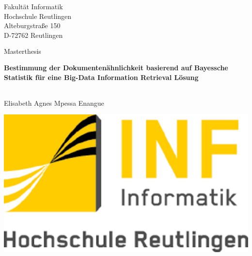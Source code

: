 \documentclass[paper=a4,       %
					 11pt,
					 BCOR0mm,  %
					 DIV10,    %
					 automark, %
					 twoside,
					 halfparskip,
					 bibtotoc,
					 headsepline,
					 normalheadings,
					 appendixprefix,
					 pagesize  %
 ]{scrbook}
\begin{document}
\pagestyle{plain}
\begin{titlepage}
\begin{sffamily}
\begin{center}
Fakult\"at Informatik\\
Hochschule Reutlingen\\
Alteburgstra\ss{}e 150\\
D-72762 Reutlingen\\
\end{center}

\vspace{3.5cm}

\begin{center}
{Masterthesis}\\
\vspace{0.5cm}
\begin{minipage}{8.5cm}
\begin{center}
 
  \Large \textbf{Bestimmung der Dokumenten\"ahnlichkeit basierend auf Bayessche Statistik f\"ur eine Big-Data Information Retrieval L\"osung}
 
\end{center}
\end{minipage}
\\
\vspace{1cm}
{Elisabeth Agnes Mpessa Enangue}
\end{center}

\vspace{1.0cm}

\begin{center}
\begin{minipage}{3cm}
\begin{center}
	\includegraphics[width=2\textwidth]{./gfx/logo_INFFH.png}
	

\end{center}
\end{minipage}
\end{center}
\end{sffamily}
\end{titlepage}
\end{document}
